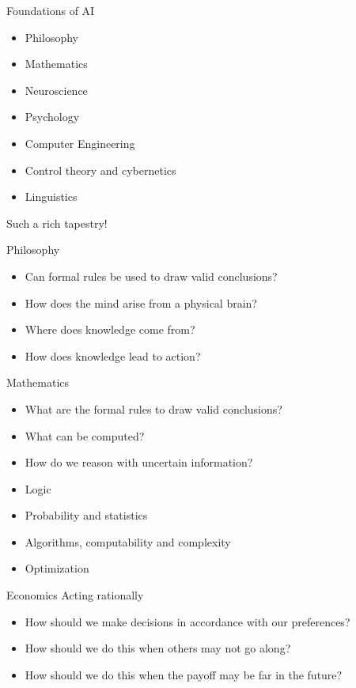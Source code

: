 \documentclass[
  10pt,
  ignorenonframetext,
  aspectratio=1610,
]{ltx-talk}
\providecommand{\tightlist}{%
  \setlength{\itemsep}{0pt}\setlength{\parskip}{0pt}}
\begin{document}
\begin{frame}{Foundations of AI}
\protect{}\label{foundations-of-ai}
\begin{itemize}
\tightlist
\item
  Philosophy
\item
  Mathematics
\item
  Neuroscience
\item
  Psychology
\item
  Computer Engineering
\item
  Control theory and cybernetics
\item
  Linguistics
\end{itemize}

Such a rich tapestry!
\end{frame}

\begin{frame}{Philosophy}
\protect{}\label{philosophy}
\begin{itemize}
\tightlist
\item
  Can formal rules be used to draw valid conclusions?
\item
  How does the mind arise from a physical brain?
\item
  Where does knowledge come from?
\item
  How does knowledge lead to action?
\end{itemize}
\end{frame}

\begin{frame}{Mathematics}
\protect{}\label{mathematics}
\begin{itemize}
\item
  What are the formal rules to draw valid conclusions?
\item
  What can be computed?
\item
  How do we reason with uncertain information?
\item
  Logic
\item
  Probability and statistics
\item
  Algorithms, computability and complexity
\item
  Optimization
\end{itemize}
\end{frame}

\begin{frame}{Economics}
\protect{}\label{economics}
Acting rationally

\begin{itemize}
\tightlist
\item
  How should we make decisions in accordance with our preferences?
\item
  How should we do this when others may not go along?
\item
  How should we do this when the payoff may be far in the future?
\end{itemize}
\end{frame}
\end{document}
